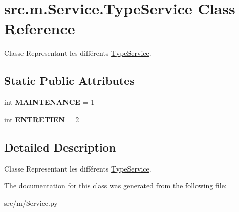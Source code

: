 \hypertarget{classsrc_1_1m_1_1_service_1_1_type_service}{}\section{src.\+m.\+Service.\+Type\+Service Class Reference}
\label{classsrc_1_1m_1_1_service_1_1_type_service}


Classe Representant les différents \hyperlink{classsrc_1_1m_1_1_service_1_1_type_service}{Type\+Service}.  


\subsection*{Static Public Attributes}
\begin{DoxyCompactItemize}
\item 
\hypertarget{classsrc_1_1m_1_1_service_1_1_type_service_a8a95ca24737d3d67d97ab82933c7209c}{}int {\bfseries M\+A\+I\+N\+T\+E\+N\+A\+N\+C\+E} = 1\label{classsrc_1_1m_1_1_service_1_1_type_service_a8a95ca24737d3d67d97ab82933c7209c}

\item 
\hypertarget{classsrc_1_1m_1_1_service_1_1_type_service_a41d70555ef5edfa7cb42ccf0b461cafe}{}int {\bfseries E\+N\+T\+R\+E\+T\+I\+E\+N} = 2\label{classsrc_1_1m_1_1_service_1_1_type_service_a41d70555ef5edfa7cb42ccf0b461cafe}

\end{DoxyCompactItemize}


\subsection{Detailed Description}
Classe Representant les différents \hyperlink{classsrc_1_1m_1_1_service_1_1_type_service}{Type\+Service}. 

The documentation for this class was generated from the following file\+:\begin{DoxyCompactItemize}
\item 
src/m/Service.\+py\end{DoxyCompactItemize}
